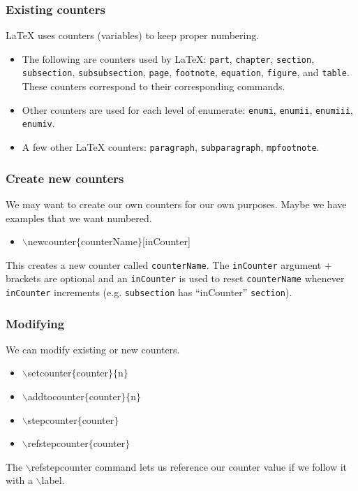 \begin{frame}  \frametitle{Existing counters}
	LaTeX uses counters (variables) to keep proper numbering. 
	\begin{itemize}
		\item The following are counters used by LaTeX: \texttt{\color{highlight}part}, \texttt{\color{highlight}chapter}, \texttt{\color{highlight}section}, \texttt{\color{highlight}subsection}, \texttt{\color{highlight}subsubsection}, \texttt{\color{highlight}page}, \texttt{\color{highlight}footnote}, \texttt{\color{highlight}equation}, \texttt{\color{highlight}figure}, and \texttt{\color{highlight}table}. These counters correspond to their corresponding commands.
		\item Other counters are used for each level of enumerate: \texttt{\color{highlight}enumi}, \texttt{\color{highlight}enumii}, \texttt{\color{highlight}enumiii}, \texttt{\color{highlight}enumiv}.
		\item A few other LaTeX counters: \texttt{\color{highlight}paragraph}, \texttt{\color{highlight}subparagraph}, \texttt{\color{highlight}mpfootnote}.
	\end{itemize}
\end{frame}

\begin{frame}  \frametitle{Create new counters}
	We may want to create our own counters for our own purposes. Maybe we have examples that we want numbered.
	\begin{itemize}
		\item[] {\color{command}$\backslash$newcounter\color{braces}$\{${\color{black}counterName}$\}$\color{black}[inCounter]}
	\end{itemize}
	This creates a new counter called \texttt{counterName}. The \texttt{inCounter} argument $+$ brackets are optional and an \texttt{inCounter} is used to reset \texttt{counterName} whenever \texttt{inCounter} increments (e.g. \texttt{subsection} has ``inCounter'' \texttt{section}).
\end{frame}

\begin{frame}  \frametitle{Modifying}
	We can modify existing or new counters.
	\begin{itemize}
		\item[] {\color{command}$\backslash$setcounter\color{braces}$\{${\color{black}counter}$\}\{${\color{black}n}$\}$}
		\item[] {\color{command}$\backslash$addtocounter\color{braces}$\{${\color{black}counter}$\}\{${\color{black}n}$\}$}
		\item[] {\color{command}$\backslash$stepcounter\color{braces}$\{${\color{black}counter}$\}$}
		\item[] {\color{command}$\backslash$refstepcounter\color{braces}$\{${\color{black}counter}$\}$}
	\end{itemize}
	The {\color{command}$\backslash$refstepcounter} command lets us reference our counter value if we follow it with a {\color{command}$\backslash$label}.
\end{frame}

